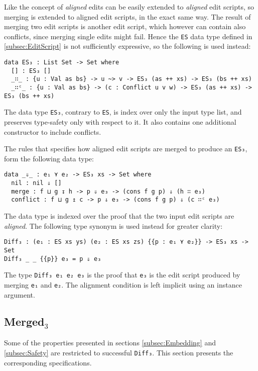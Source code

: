 \documentclass[../Thesis.tex]{subfiles}
\begin{document}
	Like the concept of \emph{aligned} edits can be easily extended to
	\emph{aligned} edit scripts, so merging is extended to aligned edit scripts,
	in the exact same way.
	The result of merging two edit scripts is another edit script,
	which however can contain also conflicts, since merging single edits 
	might fail. Hence the \texttt{ES} data type defined in 
	\ref{subsec:EditScript} is not sufficiently expressive, so the following
	is used instead:

	\begin{verbatim}
data ES₃ : List Set -> Set where
  [] : ES₃ []
  _∷_ : {u : Val as bs} -> u ~> v -> ES₃ (as ++ xs) -> ES₃ (bs ++ xs)
  _∷ᶜ_ : {u : Val as bs} -> (c : Conflict u v w) -> ES₃ (as ++ xs) -> ES₃ (bs ++ xs)
	\end{verbatim}
	
	The data type \texttt{ES₃}, contrary to \texttt{ES}, is index over only 
	the input type list, and preserves type-safety only with respect to it.
	It also contains one additional constructor to include conflicts.
	
	The rules that specifies how aligned edit scripts are merged to produce
	an \texttt{ES₃}, form the following data type:
	
\begin{verbatim}
data _⇓_ : e₁ ⋎ e₂ -> ES₃ xs -> Set where
  nil : nil ⇓ []
  merge : f ⊔ g ↧ h -> p ⇓ e₃ -> (cons f g p) ⇓ (h ∷ e₃)
  conflict : f ⊔ g ↥ c -> p ⇓ e₃ -> (cons f g p) ⇓ (c ∷ᶜ e₃)
\end{verbatim}

	The data type is indexed over the proof that the two input edit scripts are
	\emph{aligned}. 
	The following type synonym is used instead for greater clarity:
\begin{verbatim}
Diff₃ : (e₁ : ES xs ys) (e₂ : ES xs zs) {{p : e₁ ⋎ e₂}} -> ES₃ xs -> Set
Diff₃ _ _ {{p}} e₃ = p ⇓ e₃
\end{verbatim}
	The type \texttt{Diff₃ e₁ e₂ e₃} is the proof that \texttt{e₃} is the edit script
	produced by merging \texttt{e₁} and \texttt{e₂}. The alignment condition is 
	left implicit using	 an instance argument.
	
	\subsection{Merged$_3$}
	Some of the properties presented in sections \ref{subsec:Embedding} and 
	\ref{subsec:Safety} are restricted to successful \texttt{Diff₃}.
	This section presents the corresponding specifications.
\end{document}
